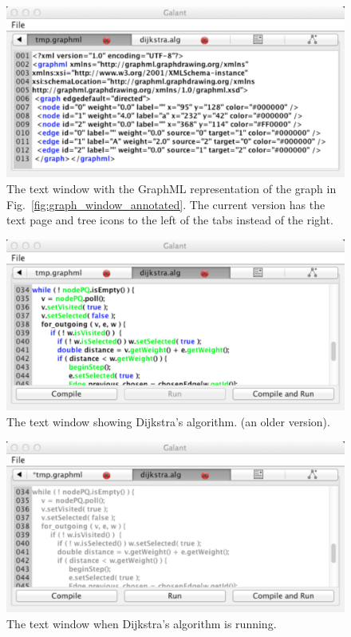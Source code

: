 \begin{figure}[p!]
\includegraphics[scale=0.5]{X_graphml_window}
\caption{The text window with the GraphML representation of the graph in
Fig.~\ref{fig:graph_window_annotated}. The current version has the text
page and tree icons to the left of the tabs instead of the right.}
\label{fig:graphml_window}
\end{figure}

\begin{figure}[p!]
\includegraphics[scale=0.5]{X_algorithm_window}
\caption{The text window showing Dijkstra's algorithm.
(an older version).}
\label{fig:algorithm_text}
\end{figure}

\begin{figure}[p!]
\includegraphics[scale=0.5]{X_algorithm_running}
\caption{The text window when Dijkstra's algorithm is running.}
\label{fig:algorithm_running}
\end{figure}

